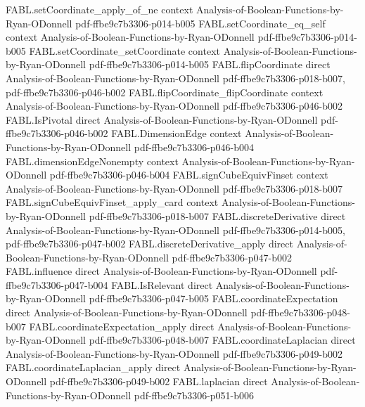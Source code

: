 \begin{theorem}
\proofstep
  {FABL.setCoordinate_apply_of_ne}
  {context}
  {Analysis-of-Boolean-Functions-by-Ryan-ODonnell}
  {pdf-ffbe9c7b3306-p014-b005}
\proofstep
  {FABL.setCoordinate_eq_self}
  {context}
  {Analysis-of-Boolean-Functions-by-Ryan-ODonnell}
  {pdf-ffbe9c7b3306-p014-b005}
\proofstep
  {FABL.setCoordinate_setCoordinate}
  {context}
  {Analysis-of-Boolean-Functions-by-Ryan-ODonnell}
  {pdf-ffbe9c7b3306-p014-b005}
\proofstep
  {FABL.flipCoordinate}
  {direct}
  {Analysis-of-Boolean-Functions-by-Ryan-ODonnell}
  {pdf-ffbe9c7b3306-p018-b007,
    pdf-ffbe9c7b3306-p046-b002}
\proofstep
  {FABL.flipCoordinate_flipCoordinate}
  {context}
  {Analysis-of-Boolean-Functions-by-Ryan-ODonnell}
  {pdf-ffbe9c7b3306-p046-b002}
\proofstep
  {FABL.IsPivotal}
  {direct}
  {Analysis-of-Boolean-Functions-by-Ryan-ODonnell}
  {pdf-ffbe9c7b3306-p046-b002}
\proofstep
  {FABL.DimensionEdge}
  {context}
  {Analysis-of-Boolean-Functions-by-Ryan-ODonnell}
  {pdf-ffbe9c7b3306-p046-b004}
\proofstep
  {FABL.dimensionEdgeNonempty}
  {context}
  {Analysis-of-Boolean-Functions-by-Ryan-ODonnell}
  {pdf-ffbe9c7b3306-p046-b004}
\proofstep
  {FABL.signCubeEquivFinset}
  {context}
  {Analysis-of-Boolean-Functions-by-Ryan-ODonnell}
  {pdf-ffbe9c7b3306-p018-b007}
\proofstep
  {FABL.signCubeEquivFinset_apply_card}
  {context}
  {Analysis-of-Boolean-Functions-by-Ryan-ODonnell}
  {pdf-ffbe9c7b3306-p018-b007}
\proofstep
  {FABL.discreteDerivative}
  {direct}
  {Analysis-of-Boolean-Functions-by-Ryan-ODonnell}
  {pdf-ffbe9c7b3306-p014-b005,
    pdf-ffbe9c7b3306-p047-b002}
\proofstep
  {FABL.discreteDerivative_apply}
  {direct}
  {Analysis-of-Boolean-Functions-by-Ryan-ODonnell}
  {pdf-ffbe9c7b3306-p047-b002}
\proofstep
  {FABL.influence}
  {direct}
  {Analysis-of-Boolean-Functions-by-Ryan-ODonnell}
  {pdf-ffbe9c7b3306-p047-b004}
\proofstep
  {FABL.IsRelevant}
  {direct}
  {Analysis-of-Boolean-Functions-by-Ryan-ODonnell}
  {pdf-ffbe9c7b3306-p047-b005}
\proofstep
  {FABL.coordinateExpectation}
  {direct}
  {Analysis-of-Boolean-Functions-by-Ryan-ODonnell}
  {pdf-ffbe9c7b3306-p048-b007}
\proofstep
  {FABL.coordinateExpectation_apply}
  {direct}
  {Analysis-of-Boolean-Functions-by-Ryan-ODonnell}
  {pdf-ffbe9c7b3306-p048-b007}
\proofstep
  {FABL.coordinateLaplacian}
  {direct}
  {Analysis-of-Boolean-Functions-by-Ryan-ODonnell}
  {pdf-ffbe9c7b3306-p049-b002}
\proofstep
  {FABL.coordinateLaplacian_apply}
  {direct}
  {Analysis-of-Boolean-Functions-by-Ryan-ODonnell}
  {pdf-ffbe9c7b3306-p049-b002}
\proofstep
  {FABL.laplacian}
  {direct}
  {Analysis-of-Boolean-Functions-by-Ryan-ODonnell}
  {pdf-ffbe9c7b3306-p051-b006}

\end{theorem}
